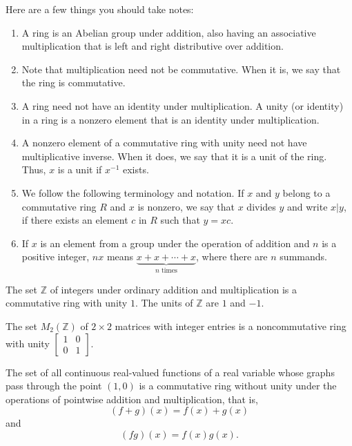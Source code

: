 Here are a few things you should take notes:
\begin{enumerate}
    \item A ring is an Abelian group under addition, also having an associative 
    multiplication that is left and right distributive over addition. 
     
    \item Note that multiplication need not be commutative. When it is, we say that the 
    ring is commutative. 
     
    \item A ring need not have an identity under multiplication. A unity (or identity) in a 
    ring is a nonzero element that is an identity under multiplication. 
     
    \item A nonzero element of a commutative ring with unity need not have 
    multiplicative inverse. When it does, we say that it is a unit of the ring. Thus, 
    $x$ is a unit if $x^{-1}$ exists.
     
    \item We follow the following terminology and notation. If $x$ and $y$ belong to a 
    commutative ring $R$ and $x$ is nonzero, we say that $x$ divides $y$ and write $x | y$, 
    if there exists an element $c$ in $R$ such that $y = xc$. 
     
    \item If $x$ is an element from a group under the operation of addition and $n$ is a 
    positive integer, $nx$ means $\underbrace{x + x + \cdots + x}_{n \text{ times}}$, where there are $n$ summands. 
\end{enumerate}

\begin{example}
    The set $\mathbb{Z}$ of integers under ordinary addition and multiplication is a commutative ring with unity $1$. The units 
    of $\mathbb{Z}$ are $1$ and $-1$.
\end{example}

\begin{example}
    The set $M_2(\mathbb{Z})$ of $2 \times 2$ matrices with integer entries is a noncommutative ring with unity 
    $\begin{bmatrix}
        1 & 0\\ 0 & 1
    \end{bmatrix}$.
\end{example}

\begin{example}
    The set of all continuous real-valued functions of a real variable whose graphs pass through 
    the point $(1, 0)$ is a commutative ring without unity under the operations of pointwise addition and multiplication, that is, 
    \[
        (f + g)(x) = f(x) + g(x)
    \]
    and 
    \[
        (fg)(x) = f(x)g(x).
    \]
\end{example}

